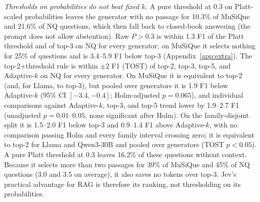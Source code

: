 \emph{Thresholds on probabilities do not beat fixed $k$.} A pure threshold at 0.3 on Platt-scaled probabilities leaves the generator with no passage for 10.3\% of MuSiQue and 21.6\% of NQ questions, which then fall back to closed-book answering (the prompt does not allow abstention). Raw $P>0.3$ is within 1.3 F1 of the Platt threshold and of top-3 on NQ for every generator; on MuSiQue it selects nothing for 25\% of questions and is 3.4--5.9 F1 below top-3 (Appendix~\ref{app:extra}).
The top-2+threshold rule is within $\pm2$ F1 (TOST) of top-2, top-3, top-5, and Adaptive-$k$ on NQ for every generator. On MuSiQue it is equivalent to top-2 (and, for Llama, to top-3), but pooled over generators it is 1.9 F1 below Adaptive-$k$ (95\% CI $[-3.4,-0.4]$; Holm-adjusted $p=0.065$), and individual comparisons against Adaptive-$k$, top-3, and top-5 trend lower by 1.9--2.7 F1 (unadjusted $p=0.01$--$0.05$, none significant after Holm). On the family-disjoint split it is 1.5--2.0 F1 below top-3 and 0.9--1.4 F1 above Adaptive-$k$, with no comparison passing Holm and every family interval crossing zero; it is equivalent to top-2 for Llama and Qwen3-30B and pooled over generators (TOST $p<0.05$). A pure Platt threshold at 0.3 leaves 16.2\% of these questions without context. Because it selects more than two passages for 39\% of MuSiQue and 45\% of NQ questions (3.0 and 3.5 on average), it also saves no tokens over top-3.
Jev's practical advantage for RAG is therefore its ranking, not thresholding on its probabilities.
